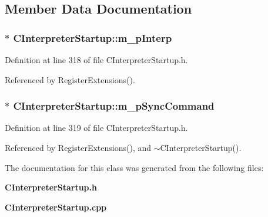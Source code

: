 \subsection{Member Data Documentation}
\subsubsection{$\ast$ CInterpreter\-Startup::m\_\-p\-Interp\hspace{0.3cm}{\tt  [private]}}\label{classCInterpreterStartup_o0}




Definition at line 318 of file CInterpreter\-Startup.h.

Referenced by Register\-Extensions().
\subsubsection{$\ast$ CInterpreter\-Startup::m\_\-p\-Sync\-Command\hspace{0.3cm}{\tt  [private]}}\label{classCInterpreterStartup_o1}




Definition at line 319 of file CInterpreter\-Startup.h.

Referenced by Register\-Extensions(), and $\sim$CInterpreter\-Startup().

The documentation for this class was generated from the following files:\begin{CompactItemize}
\item 
{\bf CInterpreter\-Startup.h}\item 
{\bf CInterpreter\-Startup.cpp}\end{CompactItemize}
